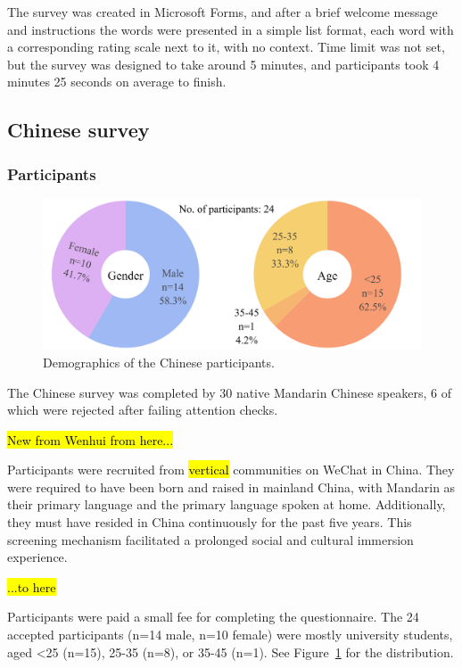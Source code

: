 \documentclass[11pt]{article}
\begin{document}
The survey was created in Microsoft Forms, and after a brief welcome message and instructions the words were presented in a simple list format, each word with a corresponding rating scale next to it, with no context. Time limit was not set, but the survey was designed to take around 5 minutes, and participants took 4 minutes 25 seconds on average to finish. 

\subsection{Chinese survey}

\subsubsection{Participants}

\begin{figure}[!ht]
  \centering
  \includegraphics[width=\linewidth]{../demographics_zh}
  \caption{Demographics of the Chinese participants.}
  \label{fig:demographics_zh}
\end{figure}

The Chinese survey was completed by 30 native Mandarin Chinese speakers, 6 of which were rejected after failing attention checks. 

\hl{New from Wenhui from here...}

Participants were recruited from \hl{vertical} communities on WeChat in China.  They were required to have been born and raised in mainland China, with Mandarin as their primary language and the primary language spoken at home. Additionally, they must have resided in China continuously for the past five years.  This screening mechanism facilitated a prolonged social and cultural immersion experience.

\hl{...to here}

Participants were paid a small fee for completing the questionnaire. The 24 accepted participants (n=14 male, n=10 female) were mostly university students, aged <25 (n=15), 25-35 (n=8), or 35-45 (n=1). See Figure~\ref{fig:demographics_zh} for the distribution.
\end{document}
